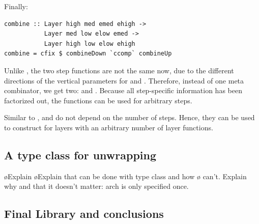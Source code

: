 \documentclass[preprint,natbib]{sigplanconf}
\begin{document}
Finally:

\begin{small}%
\begin{verbatim}
combine :: Layer high med emed ehigh ->
           Layer med low elow emed -> 
           Layer high low elow ehigh
combine = cfix $ combineDown `ccomp` combineUp
\end{verbatim}%
\end{small}


Unlike , the two step functions are not the same now, due to the different directions of the vertical parameters for  and . Therefore, instead of one meta combinator, we get two:  and . Because all step-specific information has been factorized out, the functions can be used for arbitrary steps.



Similar to ,  and  do not depend on the number of steps. Hence, they can be used to construct  for layers with an arbitrary number of layer functions.
%																
\subsection{A type class for unwrapping}

\bl
\o Explain 
\o Explain that  can be done with type class and how
\o {} can't. Explain why and that it doesn't matter: arch is only specified once.
\el

%																
\subsection{Final Library and conclusions} \label{sect:libAndConclusions}
\end{document}
